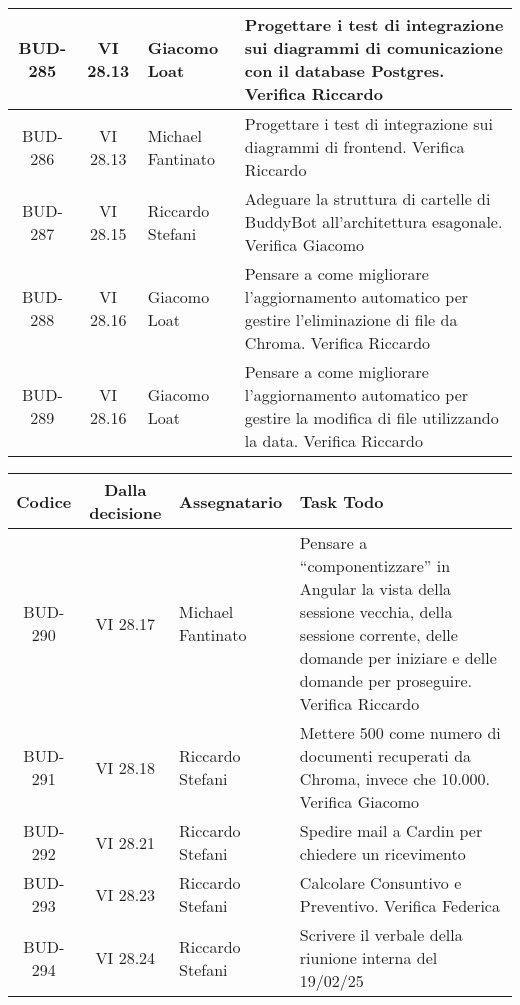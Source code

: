 \begin{table}[htbp]
\begin{tabular}{|c|c|p{}|p{}|}
    \hline
    BUD-285 & VI 28.13 & Giacomo Loat & Progettare i test di integrazione sui diagrammi di comunicazione con il database Postgres. Verifica Riccardo \\
    \hline
    BUD-286 & VI 28.13 & Michael Fantinato & Progettare i test di integrazione sui diagrammi di frontend. Verifica Riccardo \\
    \hline
    BUD-287 & VI 28.15 & Riccardo Stefani & Adeguare la struttura di cartelle di BuddyBot all'architettura esagonale. Verifica Giacomo \\
    \hline
    BUD-288 & VI 28.16 & Giacomo Loat & Pensare a come migliorare l’aggiornamento automatico per gestire l’eliminazione di file da Chroma. Verifica Riccardo \\
    \hline
    BUD-289 & VI 28.16 & Giacomo Loat & Pensare a come migliorare l’aggiornamento automatico per gestire la modifica di file utilizzando la data. Verifica Riccardo \\
    \hline
\end{tabular}
\end{table}

\clearpage
\begin{table}[htbp]
\centering
{}
\begin{tabular}{|c|c|p{}|p{}|}
    \hline
    \rowcolor[gray]{0.75}
    \textbf{Codice} & \textbf{Dalla decisione} & \textbf{Assegnatario} & \textbf{Task Todo} \\
    \hline
    BUD-290 & VI 28.17 & Michael Fantinato & Pensare a “componentizzare” in Angular la vista della sessione vecchia, della sessione
    corrente, delle domande per iniziare e delle domande per proseguire. Verifica Riccardo \\
    \hline
    BUD-291 & VI 28.18 & Riccardo Stefani & Mettere 500 come numero di documenti recuperati da Chroma, invece che 10.000. Verifica Giacomo \\
    \hline
    BUD-292 & VI 28.21 & Riccardo Stefani & Spedire mail a Cardin per chiedere un ricevimento \\
    \hline
    BUD-293 & VI 28.23 & Riccardo Stefani & Calcolare Consuntivo e Preventivo. Verifica Federica \\
    \hline
    BUD-294 & VI 28.24 & Riccardo Stefani & Scrivere il verbale della riunione interna del 19/02/25 \\
    \hline
\end{tabular}
\end{table}